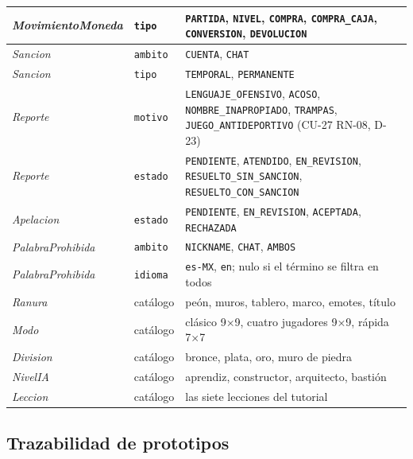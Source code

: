 \begin{center}
\begin{longtable}{|L{0.20\textwidth}|L{0.16\textwidth}|L{0.54\textwidth}|}
\textit{MovimientoMoneda}\textdagger{} & \texttt{tipo} & \texttt{PARTIDA}, \texttt{NIVEL}, \texttt{COMPRA}, \texttt{COMPRA\_\allowbreak{}CAJA}, \texttt{CONVERSION}, \texttt{DEVOLUCION} \\ \hline
\textit{Sancion} & \texttt{ambito} & \texttt{CUENTA}, \texttt{CHAT} \\ \hline
\textit{Sancion} & \texttt{tipo} & \texttt{TEMPORAL}, \texttt{PERMANENTE} \\ \hline
\textit{Reporte} & \texttt{motivo} & \texttt{LENGUAJE\_\allowbreak{}OFENSIVO}, \texttt{ACOSO}, \texttt{NOMBRE\_\allowbreak{}INAPROPIADO}, \texttt{TRAMPAS}, \texttt{JUEGO\_\allowbreak{}ANTIDEPORTIVO} (\mbox{CU-27} \mbox{RN-08}, \mbox{D-23}) \\ \hline
\textit{Reporte} & \texttt{estado} & \texttt{PENDIENTE}, \texttt{ATENDIDO}, \texttt{EN\_\allowbreak{}REVISION}\textdagger{}, \texttt{RESUELTO\_\allowbreak{}SIN\_\allowbreak{}SANCION}\textdagger{}, \texttt{RESUELTO\_\allowbreak{}CON\_\allowbreak{}SANCION}\textdagger{} \\ \hline
\textit{Apelacion}\textdagger{} & \texttt{estado} & \texttt{PENDIENTE}, \texttt{EN\_\allowbreak{}REVISION}, \texttt{ACEPTADA}, \texttt{RECHAZADA} \\ \hline
\textit{PalabraProhibida} & \texttt{ambito} & \texttt{NICKNAME}, \texttt{CHAT}, \texttt{AMBOS} \\ \hline
\textit{PalabraProhibida} & \texttt{idioma} & \texttt{es-MX}, \texttt{en}; nulo si el término se filtra en todos \\ \hline
\textit{Ranura}\textdagger{} & catálogo & peón, muros, tablero, marco, emotes, título \\ \hline
\textit{Modo} & catálogo & clásico 9×9, cuatro jugadores 9×9, rápida 7×7 \\ \hline
\textit{Division}\textdagger{} & catálogo & bronce, plata, oro, muro de piedra \\ \hline
\textit{NivelIA}\textdagger{} & catálogo & aprendiz, constructor, arquitecto, bastión \\ \hline
\textit{Leccion}\textdagger{} & catálogo & las siete lecciones del tutorial \\ \hline
\end{longtable}
\end{center}

\subsection*{Trazabilidad de prototipos}

